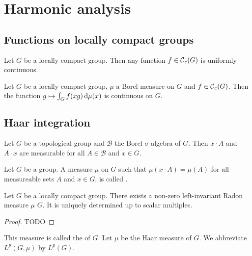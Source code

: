 \chapter{Harmonic analysis}
\section{Functions on locally compact groups}

\begin{proposition}
Let $G$ be a locally compact group. Then any function $f\in \operatorname{\mathcal{C}}_c(G)$ is uniformly continuous.
\end{proposition}

\begin{proposition} \label{integralCompactSupportContinuous}
Let $G$ be a locally compact group, $\mu$ a Borel measure on $G$ and $f\in \operatorname{\mathcal{C}}_c(G)$.
Then the function $g\mapsto \int_G f(xg)\operatorname{d \!}{\mu(x)}$ is continuous on $G$.
\end{proposition}

\section{Haar integration}

\begin{lemma}
Let $G$ be a topological group and $\mathcal{B}$ the Borel $\sigma$-algebra of $G$. Then $x\cdot A$ and $A\cdot x$ are measurable for all $A\in \mathcal{B}$ and $x\in G$.
\end{lemma}

\begin{definition}
Let $G$ be a group. A measure $\mu$ on $G$ such that $\mu(x\cdot A) = \mu(A)$ for all measureable sets $A$ and $x\in G$,
is called .
\end{definition}

\begin{theorem}
Let $G$ be a locally compact group. There exists a non-zero left-invariant Radon measure $\mu$ $G$.
It is uniquely determined up to scalar multiples.
\end{theorem}
\begin{proof}
TODO
\end{proof}

\begin{definition}
This measure is called the  of $G$. Let $\mu$ be the Haar measure of $G$. We abbreviate $L^p(G,\mu)$ by $L^p(G)$.
\end{definition}

